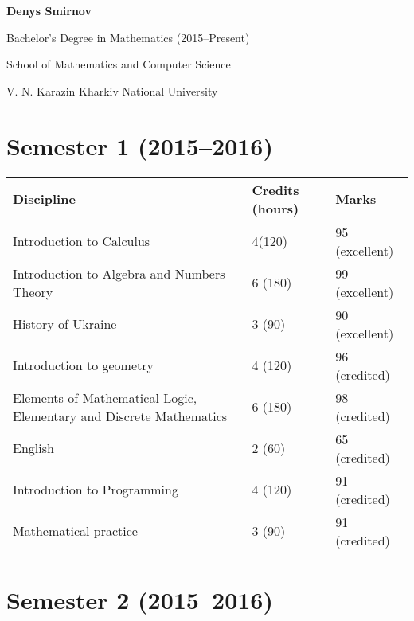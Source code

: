 \documentclass[10pt]{extarticle}
\begin{document}
\begin{center}
    \Large

    \textbf{Denys Smirnov}

    Bachelor's Degree in Mathematics (2015--Present)

    School of Mathematics and Computer Science

    V. N. Karazin Kharkiv National University

\end{center}

\section*{Semester 1 (2015--2016)}

\begin{tabularx}{\textwidth}{ | X | l | l | }

\hline
    \textbf{Discipline}              & \textbf{Credits (hours)} & \textbf{Marks} \\
\hline
    Introduction to Calculus                   & 4(120)          & 95 (excellent) \\
    Introduction to Algebra and Numbers Theory & 6 (180)         & 99 (excellent) \\
    History of Ukraine                         & 3 (90)          & 90 (excellent) \\
\hline
    Introduction to geometry                   & 4 (120)         & 96 (credited)  \\
    Elements of Mathematical Logic,
        Elementary and Discrete Mathematics    & 6 (180)         & 98 (credited)  \\
    English                                    & 2 (60)          & 65 (credited)  \\
    Introduction to Programming                & 4 (120)         & 91 (credited)  \\
    Mathematical practice                      & 3 (90)          & 91 (credited)  \\
\hline
\end{tabularx}


\section*{Semester 2 (2015--2016)}
\end{document}
